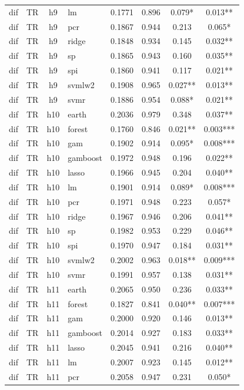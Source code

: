 \begin{ThreePartTable}
\begin{longtable}[t]{llclcccc}
dif & TR & h9 & lm & 0.1771 & 0.896 & 0.079* & 0.013**\\
dif & TR & h9 & pcr & 0.1867 & 0.944 & 0.213 & 0.065*\\
dif & TR & h9 & ridge & 0.1848 & 0.934 & 0.145 & 0.032**\\
dif & TR & h9 & sp & 0.1865 & 0.943 & 0.160 & 0.035**\\
dif & TR & h9 & spi & 0.1860 & 0.941 & 0.117 & 0.021**\\
dif & TR & h9 & svmlw2 & 0.1908 & 0.965 & 0.027** & 0.013**\\
dif & TR & h9 & svmr & 0.1886 & 0.954 & 0.088* & 0.021**\\
\addlinespace
dif & TR & h10 & earth & 0.2036 & 0.979 & 0.348 & 0.037**\\
dif & TR & h10 & forest & 0.1760 & 0.846 & 0.021** & 0.003***\\
dif & TR & h10 & gam & 0.1902 & 0.914 & 0.095* & 0.008***\\
dif & TR & h10 & gamboost & 0.1972 & 0.948 & 0.196 & 0.022**\\
dif & TR & h10 & lasso & 0.1966 & 0.945 & 0.204 & 0.040**\\
dif & TR & h10 & lm & 0.1901 & 0.914 & 0.089* & 0.008***\\
dif & TR & h10 & pcr & 0.1971 & 0.948 & 0.223 & 0.057*\\
dif & TR & h10 & ridge & 0.1967 & 0.946 & 0.206 & 0.041**\\
dif & TR & h10 & sp & 0.1982 & 0.953 & 0.229 & 0.046**\\
dif & TR & h10 & spi & 0.1970 & 0.947 & 0.184 & 0.031**\\
dif & TR & h10 & svmlw2 & 0.2002 & 0.963 & 0.018** & 0.009***\\
dif & TR & h10 & svmr & 0.1991 & 0.957 & 0.138 & 0.031**\\
\addlinespace
dif & TR & h11 & earth & 0.2065 & 0.950 & 0.236 & 0.033**\\
dif & TR & h11 & forest & 0.1827 & 0.841 & 0.040** & 0.007***\\
dif & TR & h11 & gam & 0.2000 & 0.920 & 0.146 & 0.013**\\
dif & TR & h11 & gamboost & 0.2014 & 0.927 & 0.183 & 0.033**\\
dif & TR & h11 & lasso & 0.2045 & 0.941 & 0.216 & 0.040**\\
dif & TR & h11 & lm & 0.2007 & 0.923 & 0.145 & 0.012**\\
dif & TR & h11 & pcr & 0.2058 & 0.947 & 0.231 & 0.050*\\

\end{longtable}
\end{ThreePartTable}
